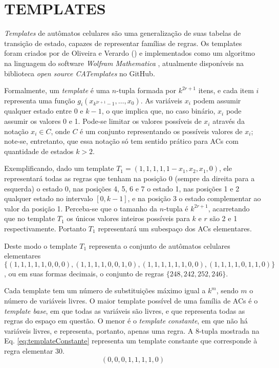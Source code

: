 \section{TEMPLATES}
\label{sec:templates}

\textit{Templates} de autômatos celulares são uma generalização de suas tabelas de transição de estado, capazes de representar famílias de regras. Os templates foram criados por de Oliveira e Verardo (\citeyear{deOliveira2014}) e implementados como um algoritmo na linguagem do software \textit{Wolfram Mathematica} \cite{woframMathematica10}, atualmente disponíveis na biblioteca \textit{open source CATemplates} \cite{CATemplates} no GitHub.

Formalmente, um \textit{template} é uma $n$-tupla formada por $k^{2r+1}$ itens, e cada item $i$ representa uma função $g_i(x_{k^{2r+1}-1},\dots,x_0)$. As variáveis $x_i$ podem assumir qualquer estado entre 0 e $k-1$, o que implica que, no caso binário, $x_i$ pode assumir os valores 0 e 1. Pode-se limitar os valores possíveis de $x_i$ através da notação $x_i \in C$, onde $C$ é um conjunto representando os possíveis valores de $x_i$; note-se, entretanto, que essa notação só tem sentido prático para ACs com quantidade de estados $k>2$.

Exemplificando, dado um template $T_1 = (1,1,1,1,1-x_1,x_2,x_1,0)$, ele representará todas as regras que tenham na posição 0 (sempre da direita para a esquerda) o estado 0, nas posições 4, 5, 6 e 7 o estado 1, nas posições 1 e 2 qualquer estado no intervalo $[0,k-1]$, e na posição 3 o estado complementar ao valor da posição 1. Perceba-se que o tamanho da $n$-tupla é $k^{2r+1}$, acarretando que no template $T_1$ os únicos valores inteiros possíveis para $k$ e $r$ são 2 e 1 respectivamente. Portanto $T_1$ representará um subespaço dos ACs elementares.

Deste modo o template $T_1$ representa o conjunto de autômatos celulares elementares $\{(1,1,1,1,1,0,0,0),(1,1,1,1,0,0,1,0),(1,1,1,1,1,1,0,0),(1,1,1,1,0,1,1,0)\}$, ou em suas formas decimais, o conjunto de regras $\{248,242,252,246\}$.

Cada template tem um número de substituições máximo igual a $k^m$, sendo $m$ o número de variáveis livres. O maior template possível de uma família de ACs é o \textit{template base}, em que todas as variáveis são livres, e que representa todas as regras do espaço em questão. O menor é o \textit{template constante}, em que não há variáveis livres, e representa, portanto, apenas uma regra. A $8$-tupla mostrada na Eq. \eqref{eq:templateConstante} representa um template constante que corresponde à regra elementar 30.  
\begin{equation}
(0,0,0,1,1,1,1,0)
\label{eq:templateConstante}
\end{equation}

